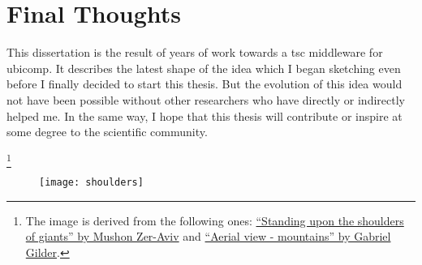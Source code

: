 \section{Final Thoughts}


This dissertation is the result of years of work towards a \acl{tsc} middleware for \acl{ubicomp}.
It describes the latest shape of the idea which I began sketching even before I finally decided to start this thesis.
But the evolution of this idea would not have been possible without other researchers who have directly or indirectly helped me. %
In the same way, I hope that this thesis will contribute or inspire at some degree to the scientific community.

\let\thefootnote\relax\footnote{
The image is derived from the following ones: \href{http://www.flickr.com/photos/mushon/282287572/}{``Standing upon the shoulders of giants'' by Mushon Zer-Aviv}
and
\href{http://www.flickr.com/photos/futurefashion/130994094/}{``Aerial view - mountains'' by Gabriel Gilder}.
}


\begin{figure}[h]
    \centering
    \texttt{[image: shoulders]}
    \caption*{}{ }
    \label{fig:shouldersOfGiants}
\end{figure}